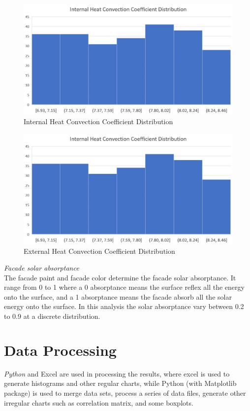 \documentclass[a4paper, oneside]{discothesis}
\begin{document}
			\begin{figure}[ht!]
			\centering
			\includegraphics[scale=0.35]{Hongger_InConvDist.jpg}
			\caption{Internal Heat Convection Coefficient Distribution}
			\label{fig:HonggerIntConvDist}
			\end{figure}
			
			\begin{figure}[ht!]
			\centering
			\includegraphics[scale=0.35]{Hongger_InConvDist.jpg}
			\caption{External Heat Convection Coefficient Distribution}
			\label{fig:HonggerExtConvDist}
			\end{figure}
			
		\textit{Facade solar absorptance}\\
			The facade paint and facade color determine the facade solar absorptance. It range from 0 to 1 where a 0 absorptance means the surface reflex all the energy onto the surface, and a 1 absorptance means the facade absorb all the solar energy onto the surface. In this analysis the solar absorptance vary between 0.2 to 0.9 at a discrete distribution.
	\section{Data Processing}
		\textit{Python} and Excel are used in processing the results, where excel is used to generate histograms and other regular charts, while Python (with Matplotlib package) is used to merge data sets, process a series of data files, generate other irregular charts such as correlation matrix, and some boxplots.
\end{document}
